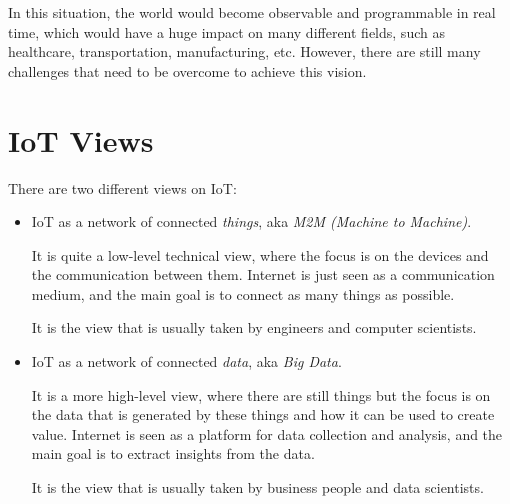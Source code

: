 In this situation, the world would become observable and programmable in real time, which would have a huge impact on many different fields, such as healthcare, transportation, manufacturing, etc. However, there are still many challenges that need to be overcome to achieve this vision.

\section{IoT Views}

There are two different views on IoT:
\begin{itemize}
    \item IoT as a network of connected \emph{things}, aka \emph{M2M (Machine to Machine)}.
    
    It is quite a low-level technical view, where the focus is on the devices and the communication between them. Internet is just seen as a communication medium, and the main goal is to connect as many things as possible.    

    It is the view that is usually taken by engineers and computer scientists. 
    \item IoT as a network of connected \emph{data}, aka \emph{Big Data}.
    
    It is a more high-level view, where there are still things but the focus is on the data that is generated by these things and how it can be used to create value. Internet is seen as a platform for data collection and analysis, and the main goal is to extract insights from the data.
    
    It is the view that is usually taken by business people and data scientists.
\end{itemize}